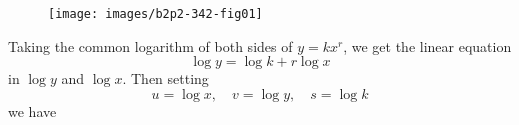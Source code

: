 \documentclass[11pt]{amsbook}
\begin{document}
\begin{exmp}
        \begin{hSolution}
            \begin{figure}[htb]
	            \texttt{[image: images/b2p2-342-fig01]}
            \end{figure}

            Taking the common logarithm of both sides of $y = k x^{r} $, we get the linear equation
                \[
                    \log y = \log k + r \log x
                \]
            in $ \log y $ and $ \log x $. Then setting 
            \[
                u = \log x, \quad v = \log y, \quad s = \log k
            \]
            we have 
        \end{hSolution}
    \end{exmp}
\end{document}
